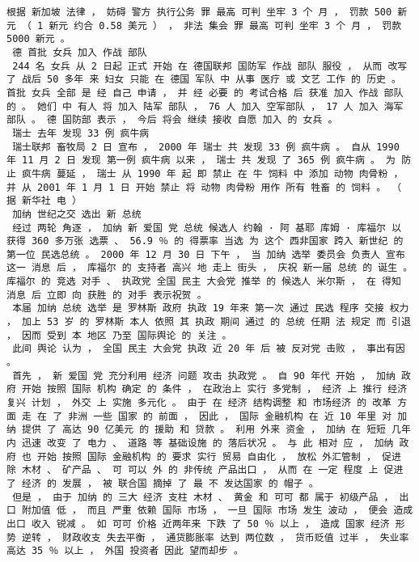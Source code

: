 \documentclass{article}
\begin{document}
\begin{Verbatim}[commandchars=\\\{\}]
 根据 新加坡 法律 ， 妨碍 警方 执行公务 罪 最高 可判 坐牢 3 个 月 ， 罚款 500 新元 （ 1 新元 约合 0.58 美元 ） ， 非法 集会 罪 最高 可判 坐牢 3 个 月 ， 罚款 5000 新元 。 
 德 首批 女兵 加入 作战 部队 
 244 名 女兵 从 2 日起 正式 开始 在 德国联邦 国防军 作战 部队 服役 ， 从而 改写 了 战后 50 多年 来 妇女 只能 在 德国 军队 中 从事 医疗 或 文艺 工作 的 历史 。 首批 女兵 全部 是 经 自己 申请 ， 并 经 必要 的 考试合格 后 获准 加入 作战 部队 的 。 她们 中 有人 将 加入 陆军 部队 ， 76 人 加入 空军部队 ， 17 人 加入 海军 部队 。 德 国防部 表示 ， 今后 将会 继续 接收 自愿 加入 的 女兵 。 
 瑞士 去年 发现 33 例 疯牛病 
 瑞士联邦 畜牧局 2 日 宣布 ， 2000 年 瑞士 共 发现 33 例 疯牛病 。 自从 1990 年 11 月 2 日 发现 第一例 疯牛病 以来 ， 瑞士 共 发现 了 365 例 疯牛病 。 为 防止 疯牛病 蔓延 ， 瑞士 从 1990 年 起 即 禁止 在 牛 饲料 中 添加 动物 肉骨粉 ， 并 从 2001 年 1 月 1 日 开始 禁止 将 动物 肉骨粉 用作 所有 牲畜 的 饲料 。 （ 据 新华社 电 ） 
 加纳 世纪之交 选出 新 总统 
 经过 两轮 角逐 ， 加纳 新 爱国 党 总统 候选人 约翰 · 阿 基耶 库姆 · 库福尔 以 获得 360 多万张 选票 、 56.9 ％ 的 得票率 当选 为 这个 西非国家 跨入 新世纪 的 第一位 民选总统 。 2000 年 12 月 30 日 下午 ， 当 加纳 选举 委员会 负责人 宣布 这一 消息 后 ， 库福尔 的 支持者 高兴 地 走上 街头 ， 庆祝 新一届 总统 的 诞生 。 库福尔 的 竞选 对手 、 执政党 全国 民主 大会党 推举 的 候选人 米尔斯 ， 在 得知 消息 后 立即 向 获胜 的 对手 表示祝贺 。 
 本届 加纳 总统 选举 是 罗林斯 政府 执政 19 年来 第一次 通过 民选 程序 交接 权力 ， 加上 53 岁 的 罗林斯 本人 依照 其 执政 期间 通过 的 总统 任期 法 规定 而 引退 ， 因而 受到 本 地区 乃至 国际舆论 的 关注 。 
 此间 舆论 认为 ， 全国 民主 大会党 执政 近 20 年 后 被 反对党 击败 ， 事出有因 。 
 首先 ， 新 爱国 党 充分利用 经济 问题 攻击 执政党 。 自 90 年代 开始 ， 加纳 政府 开始 按照 国际 机构 确定 的 条件 ， 在政治上 实行 多党制 ， 经济 上 推行 经济 复兴 计划 ， 外交 上 实施 多元化 。 由于 在 经济 结构调整 和 市场经济 的 改革 方面 走 在 了 非洲 一些 国家 的 前面 ， 因此 ， 国际 金融机构 在 近 10 年里 对 加纳 提供 了 高达 90 亿美元 的 援助 和 贷款 。 利用 外来 资金 ， 加纳 在 短短 几年 内 迅速 改变 了 电力 、 道路 等 基础设施 的 落后状况 。 与 此 相对 应 ， 加纳 政府 也 开始 按照 国际 金融机构 的 要求 实行 贸易 自由化 ， 放松 外汇管制 ， 促进 除 木材 、 矿产品 、 可 可以 外 的 非传统 产品出口 ， 从而 在 一定 程度 上 促进 了 经济 的 发展 ， 被 联合国 摘掉 了 最 不 发达国家 的 帽子 。 
 但是 ， 由于 加纳 的 三大 经济 支柱 木材 、 黄金 和 可可 都 属于 初级产品 ， 出口 附加值 低 ， 而且 严重 依赖 国际 市场 ， 一旦 国际 市场 发生 波动 ， 便会 造成 出口 收入 锐减 。 如 可可 价格 近两年来 下跌 了 50 ％ 以上 ， 造成 国家 经济 形势 逆转 ， 财政收支 失去平衡 ， 通货膨胀率 达到 两位数 ， 货币贬值 过半 ， 失业率 高达 35 ％ 以上 ， 外国 投资者 因此 望而却步 。 

\end{Verbatim}
\end{document}
